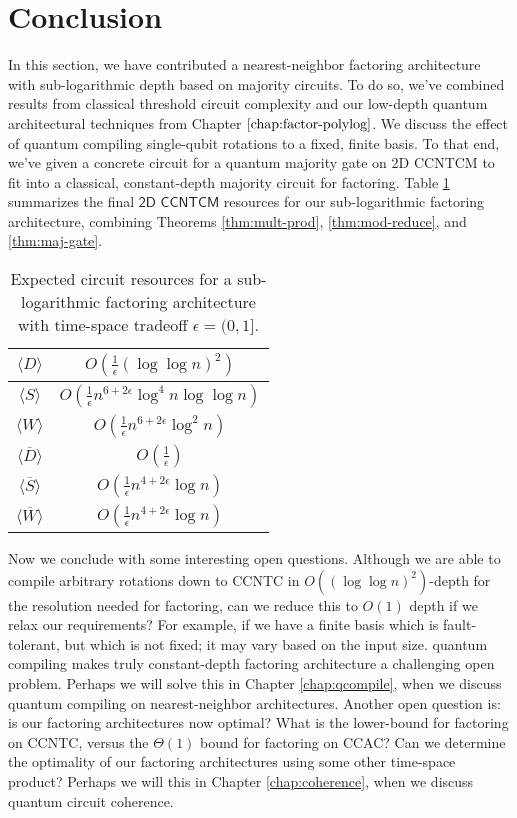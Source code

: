 \section{Conclusion}
\label{sec:fsl-conclude}

In this section, we have contributed a nearest-neighbor factoring architecture with
sub-logarithmic depth based on majority circuits. To do so, we've combined results from classical threshold
circuit complexity and our low-depth quantum architectural techniques from
Chapter $\ref{chap:factor-polylog}$.
We discuss the effect of quantum compiling single-qubit rotations to a fixed, finite basis.
To that end, we've given a concrete circuit for
a quantum majority gate on \textsf{2D CCNTCM} to fit into a classical, constant-depth majority circuit
for factoring. Table \ref{tab:sublog-resources} summarizes the final $\textsf{2D CCNTCM}$ resources for our sub-logarithmic
factoring architecture, combining Theorems \ref{thm:mult-prod}, \ref{thm:mod-reduce}, and \ref{thm:maj-gate}.

\begin{table}[htb!]
\begin{tabular}{c|c|}
\hline
$\langle D \rangle$ & $O(\frac{1}{\epsilon}(\log\log n)^2)$ \\
\hline
$\langle S \rangle$ & $O(\frac{1}{\epsilon}n^{6 + 2\epsilon}\log^4 n\log\log n)$ \\
\hline
$\langle W \rangle$ & $O(\frac{1}{\epsilon}n^{6 + 2\epsilon}\log^2 n)$ \\
\hline
$\langle \overline{D} \rangle$ & $O(\frac{1}{\epsilon})$ \\
\hline
$\langle \overline{S} \rangle$ & $O(\frac{1}{\epsilon}n^{4+2\epsilon}\log n)$ \\
\hline
$\langle \overline{W} \rangle$ & $O(\frac{1}{\epsilon}n^{4+2\epsilon}\log n)$ \\
\hline
\end{tabular}
\caption{Expected circuit resources for a sub-logarithmic factoring architecture with time-space tradeoff $\epsilon = (0,1]$.}
\label{tab:sublog-resources}
\end{table}

Now we conclude with some interesting open questions.
Although we are able to compile arbitrary rotations down to \textsf{CCNTC} in $O((\log \log n)^2)$-depth
for the resolution needed for factoring, can we reduce this to $O(1)$ depth if we relax our
requirements? For example, if we have a finite basis which is fault-tolerant, but which is not fixed;
it may vary based on the input size. quantum compiling makes truly constant-depth factoring architecture a challenging
open problem. Perhaps we will solve this in Chapter \ref{chap:qcompile}, when we discuss quantum compiling on
nearest-neighbor architectures.
Another open question is: is our factoring architectures now optimal?
What is the lower-bound for factoring on \textsf{CCNTC}, versus the $\Theta(1)$ bound for factoring on \textsf{CCAC}?
Can we determine the optimality of our factoring architectures using some other time-space product?
Perhaps we will this in Chapter \ref{chap:coherence}, when we discuss quantum circuit coherence. 


